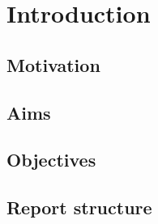 
\section{Introduction}
\subsection{Motivation}
\subsection{Aims}
\subsection{Objectives}
\subsection{Report structure}
